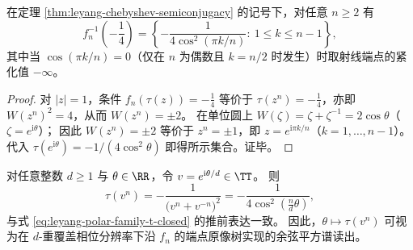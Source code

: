 \begin{corollary}[奇异环端点的余弦平方谱原像]\label{cor:leyang-endpoint-preimage-cos2-spectrum}
在定理 \ref{thm:leyang-chebyshev-semiconjugacy} 的记号下，对任意 \(n\ge 2\) 有
\[
f_n^{-1}\!\left(-\frac14\right)
=
\left\{-\frac{1}{4\cos^2(\pi k/n)}:\ 1\le k\le n-1\right\},
\]
其中当 \(\cos(\pi k/n)=0\)（仅在 \(n\) 为偶数且 \(k=n/2\) 时发生）时取射线端点的紧化值 \(-\infty\)。
\end{corollary}
\begin{proof}
对 \(|z|=1\)，条件 \(f_n(\tau(z))=-\tfrac14\) 等价于 \(\tau(z^n)=-\tfrac14\)，亦即 \(W(z^n)^2=4\)，从而 \(W(z^n)=\pm 2\)。
在单位圆上 \(W(\zeta)=\zeta+\zeta^{-1}=2\cos\theta\)（\(\zeta=e^{\mathrm{i}\theta}\)）；
因此 \(W(z^n)=\pm 2\) 等价于 \(z^n=\pm 1\)，即 \(z=e^{\mathrm{i}\pi k/n}\)（\(k=1,\dots,n-1\)）。
代入 \(\tau(e^{\mathrm{i}\theta})=-1/(4\cos^2\theta)\) 即得所示集合。证毕。
\end{proof}

\begin{remark}[与分母参数的兼容性]\label{rem:leyang-semiconjugacy-denominator-compatibility}
对任意整数 \(d\ge 1\) 与 \(\theta\in\RR\)，令 \(v=e^{\mathrm{i}\theta/d}\in\TT\)。
则
\[
\tau(v^n)
=-\frac{1}{\bigl(v^n+v^{-n}\bigr)^2}
=-\frac{1}{4\cos^2(\tfrac{n}{d}\theta)},
\]
与式 \eqref{eq:leyang-polar-family-t-closed} 的推前表达一致。
因此，\(\theta\mapsto \tau(v^n)\) 可视为在 \(d\)-重覆盖相位分辨率下沿 \(f_n\) 的端点原像树实现的余弦平方谱读出。
\end{remark}

\endinput
